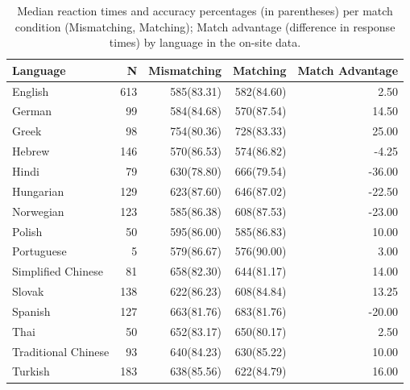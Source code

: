 \documentclass[
  man,floatsintext]{apa6}
\begin{document}
\begin{table}

\caption{\label{tab:summary-site}Median reaction times and accuracy percentages (in parentheses) per match condition (Mismatching, Matching); Match advantage (difference in response times) by language in the on-site data.}
\centering
\begin{tabular}[t]{lrrrr}
\toprule
Language & N & Mismatching & Matching & Match Advantage\\
\midrule
English & 613 & 585(83.31) & 582(84.60) & 2.50\\
German & 99 & 584(84.68) & 570(87.54) & 14.50\\
Greek & 98 & 754(80.36) & 728(83.33) & 25.00\\
Hebrew & 146 & 570(86.53) & 574(86.82) & -4.25\\
Hindi & 79 & 630(78.80) & 666(79.54) & -36.00\\
\addlinespace
Hungarian & 129 & 623(87.60) & 646(87.02) & -22.50\\
Norwegian & 123 & 585(86.38) & 608(87.53) & -23.00\\
Polish & 50 & 595(86.00) & 585(86.83) & 10.00\\
Portuguese & 5 & 579(86.67) & 576(90.00) & 3.00\\
Simplified Chinese & 81 & 658(82.30) & 644(81.17) & 14.00\\
\addlinespace
Slovak & 138 & 622(86.23) & 608(84.84) & 13.25\\
Spanish & 127 & 663(81.76) & 683(81.76) & -20.00\\
Thai & 50 & 652(83.17) & 650(80.17) & 2.50\\
Traditional Chinese & 93 & 640(84.23) & 630(85.22) & 10.00\\
Turkish & 183 & 638(85.56) & 622(84.79) & 16.00\\
\bottomrule
\end{tabular}
\end{table}
\end{document}
